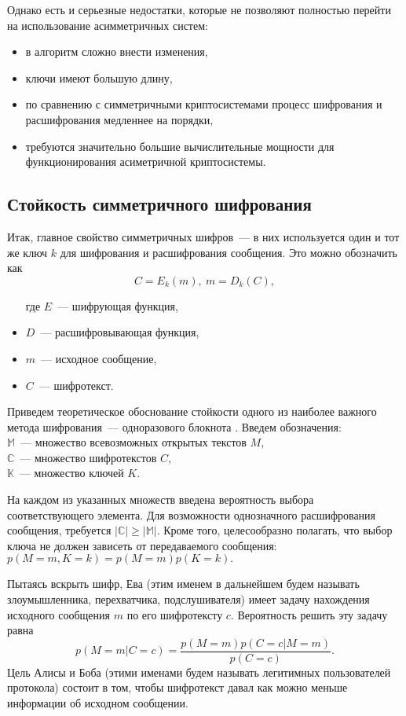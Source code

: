 Однако есть и серьезные недостатки, которые не позволяют полностью перейти на использование асимметричных систем: 
\begin{itemize}
  \item в алгоритм сложно внести изменения, 
  \item ключи имеют большую длину,
  \item по сравнению с симметричными криптосистемами процесс шифрования и расшифрования медленнее на порядки, 
  \item требуются значительно большие вычислительные мощности для функционирования асиметричной криптосистемы. 
\end{itemize}

\subsection{Стойкость симметричного шифрования}
Итак, главное свойство симметричных шифров~--- в них используется один и тот же ключ $k$ для шифрования и расшифрования сообщения.
Это можно обозначить как $$ C = E_k(m),\ m = D_k(C), $$
\begin{itemize}
  \item[где] $E$~--- шифрующая функция,
  \item $D$~--- расшифровывающая функция,
  \item $m$~--- исходное сообщение,
  \item $C$~--- шифротекст.
\end{itemize}

Приведем теоретическое обоснование стойкости одного из наиболее важного метода шифрования~--- одноразового блокнота \cite{vernam_cryptosystem}.
Введем обозначения: \\
$ \mathbb{M}$~--- множество всевозможных открытых текстов $M$, \\
$ \mathbb{C}$~--- множество шифротекстов $C$, \\
$ \mathbb{K}$~--- множество ключей $K$.

На каждом из указанных множеств введена вероятность выбора соответствующего элемента.
Для возможности однозначного расшифрования сообщения, требуется $|\mathbb{C}| \ge |\mathbb{M}|.$
Кроме того, целесообразно полагать, что выбор ключа не должен зависеть от передаваемого сообщения: $p(M = m, K = k) = p(M = m) p(K = k).$

Пытаясь вскрыть шифр, Ева (этим именем в дальнейшем будем называть злоумышленника, перехватчика, подслушивателя) имеет задачу нахождения исходного сообщения $m$ по его шифротексту $c$. Вероятность решить эту задачу равна
$$ p(M = m | C = c) = \frac{p(M = m) p(C = c|M = m)}{p(C = c)}. $$
Цель Алисы и Боба (этими именами будем называть легитимных пользователей протокола) состоит в том, чтобы шифротекст давал как можно меньше информации об исходном сообщении.

